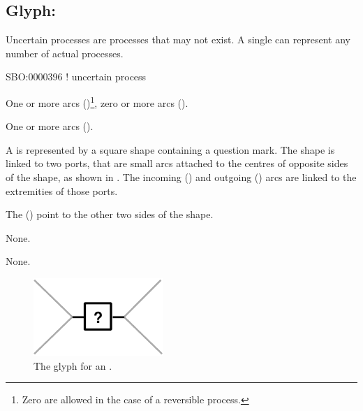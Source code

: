 \subsection{Glyph: }
\label{sec:uncertain}

Uncertain processes are processes that may not exist. A single  can represent any number of actual processes.

\begin{glyphDescription}

\glyphSboTerm
SBO:0000396 ! uncertain process


\glyphIncoming
One or more  arcs ()\footnote{Zero  are allowed in the case of a reversible process.}, zero or more  arcs ().



\glyphOutgoing
One or more  arcs ().


\glyphContainer
A  is represented by a square shape containing a question mark.
The shape is linked to two ports, that are small arcs attached to the centres of opposite sides of the shape, as shown in .
The incoming  () and outgoing  () arcs are linked to the extremities of those ports.

The  () point to the other two sides of the shape.

\glyphLabel
None.

\glyphAux
None.

\end{glyphDescription}

\begin{figure}[H]
  \centering
  \includegraphics{images/build/uncertain.pdf}
  \caption{The \PD glyph for an .}
  \label{fig:uncertain}
\end{figure}
